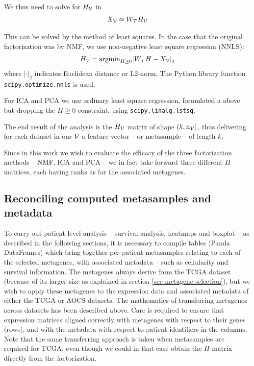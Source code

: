 \documentclass[draft, tikz, 12pt,a4paper,oneside,fleqn]{article}
\begin{document}
We thus need to solve for $H_{\mathcal{V}}$ in
\begin{equation}
	X_{\mathcal{V}}  \approx  W_{\mathcal{T}} H_{\mathcal{V}} \label{eq_Xv_WtHv}
\end{equation}

This can be solved by the method of least squares.  In the case that the original factorization was by NMF, we use non-negative least square regression (NNLS):
\begin{equation}
	H_{\mathcal{V}} = \mbox{argmin}_{H\geq 0}{\lvert W_{\mathcal{T}} H - X_{\mathcal{V}} \rvert}_2
	\label{eq_Hv_WdtXv}
\end{equation}
where ${\lvert \mathbf{\cdot} \rvert}_2$ indicates Euclidean distance or L2-norm.
The Python library function {\tt scipy.optimize.nnls} is used.

For ICA and PCA we use ordinary least square regression, formulated a above but dropping the $H\geq 0$ constraint, using {\tt scipy.linalg.lstsq}.


The end result of the analysis is the $H_{\mathcal{V}}$ matrix of shape $(k, n_{\mathcal{V}})$, thus delivering for each dataset in our $\mathcal{V}$ a feature vector -- or metasample -- of length $k$. 

Since in this work we wish to evaluate the efficacy of the three factorization methods -- NMF, ICA and PCA -- we in fact take forward three different $H$ matrices, each having ranks as for the associated metagenes.

\subsection{Reconciling computed metasamples and metadata}
\label{sec-reconciling-metasamples-metadata}

To carry out patient level analysis -- survival analysis, heatmaps and boxplot -- as described in the following sections, it is necessary to compile tables (Panda DataFrames) which bring together per-patient metasamples relating to each of the selected metagenes, with associated metadata -- such as cellularity and survival information.   The metagenes always derive from the TCGA dataset (because of its larger size as explained in section \ref{sec-metagene-selection}), but we wish to apply these metagenes to the expression data and associated metadata of either the TCGA or AOCS datasets.   
The mathematics of transferring metagenes across datasets has been described above.  Care is required to ensure that expression matrices aligned correctly with metagenes with respect to their genes (rows), and with the metadata with respect to patient identifiers in the columns.
Note that the same transferring approach is taken when metasamples are required for TCGA, even though we could in that case obtain the $H$ matrix directly from the factorization.
\end{document}
